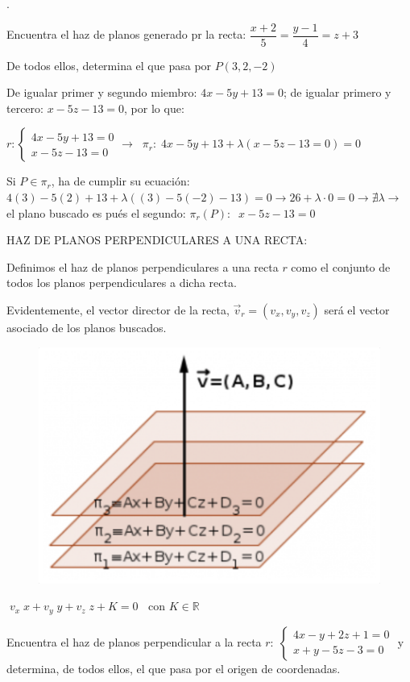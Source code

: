 \begin{ejem}.

	Encuentra el haz de planos generado pr la recta: $\dfrac{x+2}{5}=\dfrac{y-1}{4}=z+3$
	
	De todos ellos, determina el que pasa por $P(3,2,-2)$
\end{ejem}

\noindent De igualar primer y segundo miembro: $4x-5y+13=0$; de igualar primero y tercero: $x-5z-13=0$, por lo que:

\noindent $r:\begin{cases} 4x-5y+13=0\\x-5z-13=0 \end{cases} \to \; \; \pi_r: \; 4x-5y+13+\lambda(x-5z-13=0)=0$

\noindent Si $P \in \pi_r$, ha de cumplir su ecuación: $4(3)-5(2)+13+\lambda((3)-5(-2)-13)=0 \to 26+\lambda \cdot 0=0 \to \nexists \lambda \to$ el plano buscado es pués el segundo: $\pi_r(P):\; \;x-5z-13=0$



\noindent  HAZ DE PLANOS PERPENDICULARES A UNA RECTA:

\begin{multicols}{2}
\noindent Definimos el haz de planos perpendiculares a una recta $r$ como el conjunto de todos los planos perpendiculares a dicha recta.

\noindent Evidentemente, el vector director de la recta, $\vec v_r=(v_x,v_y,v_z)$ será el vector asociado de los planos buscados.
	
	\begin{figure}[H]
		\centering
		\includegraphics[width=.45\textwidth]{imagenes/imagenes10/T10IM14.png}
 	\end{figure}
\end{multicols}

\noindent $\boxed{\; v_x \; x + v_y\; y + v_z\; z + K = 0 \;\; \text{ con } K \in \mathbb R\;}$	

\begin{ejem}
Encuentra el haz de planos perpendicular a la recta $r:\; \begin{cases} 4x-y+2z+1=0 \\ x+y-5z-3=0 \end{cases}$ y determina, de todos ellos, el que pasa por el origen de coordenadas.	
\end{ejem}

